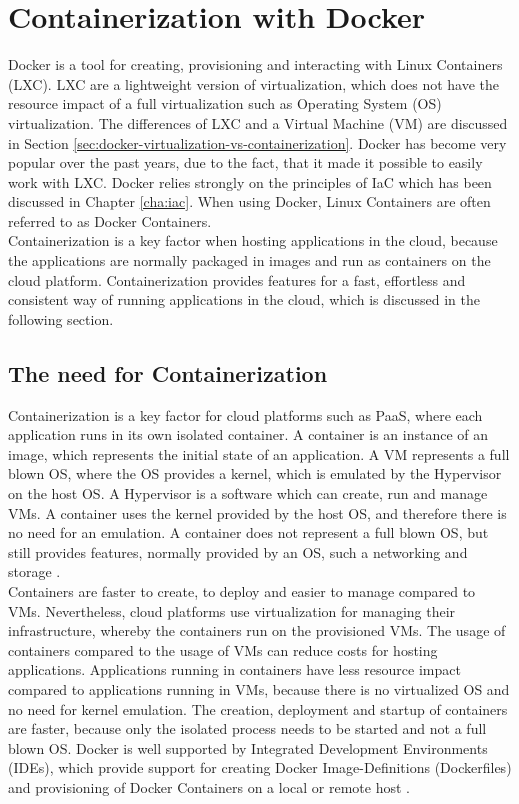 \chapter{Containerization with Docker}
\label{cha:containerization-docker}
Docker is a tool for creating, provisioning and interacting with Linux Containers (LXC). LXC are a lightweight version of virtualization, which does not have the resource impact of a full virtualization such as Operating System (OS) virtualization. The differences of LXC and a Virtual Machine (VM) are discussed in Section \vref{sec:docker-virtualization-vs-containerization}. Docker has become very popular over the past years, due to the fact, that it made it possible to easily work with LXC. Docker relies strongly on the principles of IaC which has been discussed in Chapter \vref{cha:iac}. When using Docker, Linux Containers are often referred to as Docker Containers\cite{Docker2018,LXC2018}. \\

Containerization is a key factor when hosting applications in the cloud, because the applications are normally packaged in images and run as containers on the cloud platform. Containerization provides features for a fast, effortless and consistent way of running applications in the cloud, which is discussed in the following section.

\section{The need for Containerization}
\label{sec:docker-need-for-containerization}
Containerization is a key factor for cloud platforms such as PaaS, where each application runs in its own isolated container. A container is an instance of an image, which represents the initial state of an application. A VM represents a full blown OS, where the OS provides a kernel, which is emulated by the Hypervisor on the host OS. A Hypervisor is a software which can create, run and manage VMs. A container uses the kernel provided by the host OS, and therefore there is no need for an emulation. A container does not represent a full blown OS, but still provides features, normally provided by an OS, such a networking and storage \cite{DockerVirtScheepers2014}. \\ 

Containers are faster to create, to deploy and easier to manage compared to VMs. Nevertheless, cloud platforms use virtualization for managing their infrastructure, whereby the containers run on the provisioned VMs. The usage of containers compared to the usage of VMs can reduce costs for hosting applications. Applications running in containers have less resource impact compared to applications running in VMs, because there is no virtualized OS and no need for kernel emulation. The creation, deployment and startup of containers are faster, because only the isolated process needs to be started and not a full blown OS. Docker is well supported by Integrated Development Environments (IDEs), which provide support for creating Docker Image-Definitions (Dockerfiles) and provisioning of Docker Containers on a local or remote host \cite{DockerFile2018}. \\

